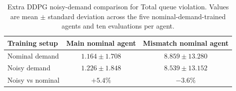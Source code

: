 \begin{table}[htbp]
\centering
\caption{Extra DDPG noisy-demand comparison for Total queue violation. Values are mean $\pm$ standard deviation across the five nominal-demand-trained agents and ten evaluations per agent.}
\label{tab:extra_dw_tot_comparison}
\begin{tabular}{lcc}
\toprule
Training setup & Main nominal agent & Mismatch nominal agent \\
\midrule
Nominal demand & $1.164 \pm 1.708$ & $8.859 \pm 13.280$ \\
Noisy demand & $1.226 \pm 1.848$ & $8.539 \pm 13.152$ \\
\midrule
Noisy vs nominal & $+5.4\%$ & $-3.6\%$ \\
\bottomrule
\end{tabular}
\end{table}
